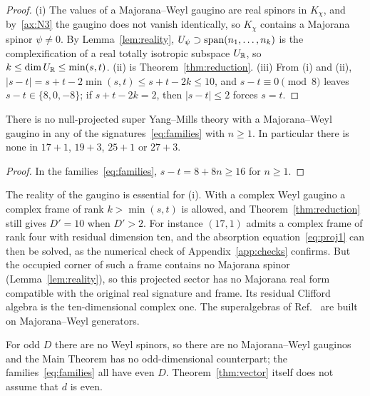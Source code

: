 \begin{proof}
(i) The values of a Majorana--Weyl gaugino are real spinors in $K_\chi$, and by~\ref{ax:N3} the gaugino does not vanish identically, so $K_\chi$ contains a Majorana spinor $\psi\ne0$. By Lemma~\ref{lem:reality}, $U_\psi\supset\operatorname{span}(n_1,\dots,n_k)$ is the complexification of a real totally isotropic subspace $U_{\mathbb{R}}$, so $k\le\dim U_{\mathbb{R}}\le\min(s,t)$. (ii) is Theorem~\ref{thm:reduction}. (iii) From (i) and (ii), $|s-t|=s+t-2\min(s,t)\le s+t-2k\le10$, and $s-t\equiv0\pmod8$ leaves $s-t\in\{8,0,-8\}$; if $s+t-2k=2$, then $|s-t|\le2$ forces $s=t$.
\end{proof}

\begin{corollary}
\label{cor:families}
There is no null-projected super Yang--Mills theory with a Majorana--Weyl gaugino in any of the signatures~\eqref{eq:families} with $n\ge1$. In particular there is none in $17+1$, $19+3$, $25+1$ or $27+3$.
\end{corollary}

\begin{proof}
In the families~\eqref{eq:families}, $s-t=8+8n\ge16$ for $n\ge1$.
\end{proof}

\begin{remark}
\label{rem:complex}
The reality of the gaugino is essential for (i). With a complex Weyl gaugino a complex frame of rank $k>\min(s,t)$ is allowed, and Theorem~\ref{thm:reduction} still gives $D'=10$ when $D'>2$. For instance $(17,1)$ admits a complex frame of rank four with residual dimension ten, and the absorption equation~\eqref{eq:proj1} can then be solved, as the numerical check of Appendix~\ref{app:checks} confirms. But the occupied corner of such a frame contains no Majorana spinor (Lemma~\ref{lem:reality}), so this projected sector has no Majorana real form compatible with the original real signature and frame. Its residual Clifford algebra is the ten-dimensional complex one. The superalgebras of Ref.~\cite{RiosMarraniChester2019} are built on Majorana--Weyl generators.
\end{remark}

\begin{remark}
\label{rem:odd}
For odd $D$ there are no Weyl spinors, so there are no Majorana--Weyl gauginos and the Main Theorem has no odd-dimensional counterpart; the families~\eqref{eq:families} all have even $D$. Theorem~\ref{thm:vector} itself does not assume that $d$ is even.
\end{remark}

